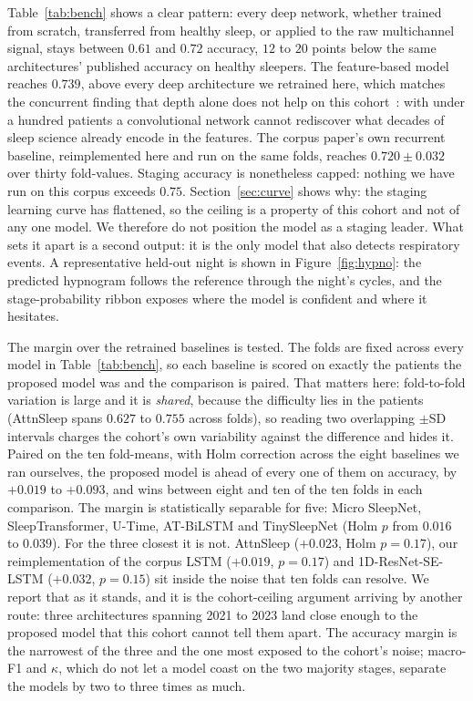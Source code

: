 \documentclass{ieeeaccess}
\newcommand{\mmAcc}{0.739}   %
\begin{document}
Table~\ref{tab:bench} shows a clear pattern: every deep network, whether trained from scratch,
transferred from healthy sleep, or applied to the raw multichannel signal, stays between $0.61$
and $0.72$ accuracy, $12$ to $20$ points below the same architectures' published accuracy on
healthy sleepers. The feature-based model reaches $\mmAcc$, above every deep architecture we
retrained here, which matches the concurrent finding that depth alone does not help on this
cohort~\cite{bose2026gap}: with under a hundred patients a convolutional network cannot
rediscover what decades of sleep science already encode in the features. The corpus paper's own recurrent
baseline, reimplemented here and run on the same folds, reaches $0.720 \pm 0.032$ over
thirty fold-values. Staging accuracy is nonetheless capped: nothing we have run on this
corpus exceeds $0.75$. Section~\ref{sec:curve} shows why: the
staging learning curve has flattened, so the ceiling is a property of this cohort and not of
any one model. We therefore do not position the model as a staging leader. What sets it apart is
a second output: it is the only model that also detects respiratory events. A representative held-out night is
shown in Figure~\ref{fig:hypno}: the predicted hypnogram follows the reference through the
night's cycles, and the stage-probability ribbon exposes where the model is confident and where
it hesitates.

The margin over the retrained baselines is tested. The folds are fixed
across every model in Table~\ref{tab:bench}, so each baseline is scored on exactly the patients
the proposed model was and the comparison is paired. That matters here: fold-to-fold variation
is large and it is \emph{shared}, because the difficulty lies in the patients (AttnSleep spans $0.627$ to $0.755$ across folds), so reading two overlapping
$\pm$SD intervals charges the cohort's own variability against the difference and hides it.
Paired on the ten fold-means, with Holm correction across the eight baselines we ran
ourselves, the proposed model is ahead of every one of them on accuracy, by $+0.019$ to
$+0.093$, and wins between eight and ten of the ten folds in each comparison. The margin is
statistically separable for five: Micro SleepNet, SleepTransformer, U-Time, AT-BiLSTM and
TinySleepNet (Holm $p$ from $0.016$ to $0.039$). For the three closest it is not. AttnSleep
($+0.023$, Holm $p=0.17$), our reimplementation of the corpus LSTM ($+0.019$, $p=0.17$) and
1D-ResNet-SE-LSTM ($+0.032$, $p=0.15$) sit inside the noise that ten folds can resolve. We
report that as it stands, and it is the cohort-ceiling argument arriving by another route:
three architectures spanning 2021 to 2023 land close enough to the proposed model that this
cohort cannot tell them apart.
The accuracy margin is the narrowest of the three and the one most exposed to the cohort's
noise; macro-F1 and $\kappa$, which do not let a model coast on the two majority stages,
separate the models by two to three times as much.
\end{document}
